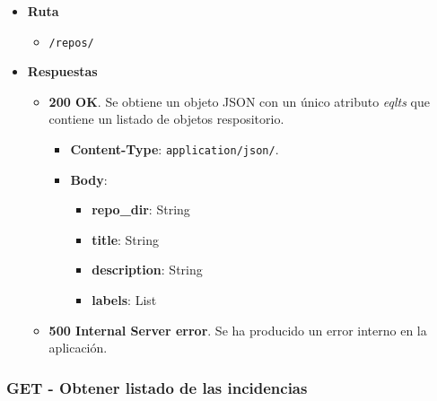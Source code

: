 \begin{itemize}
    \item[] \textbf{Ruta}
        \begin{itemize} \setlength\itemsep{0.2em}
            \item[] \texttt{/repos/}
        \end{itemize}
    \item[] \textbf{Respuestas}
        \begin{itemize} \setlength\itemsep{0.2em}
            \item[] \textbf{200 OK}. Se obtiene un objeto JSON con un único atributo \textit{eqlts} que contiene un listado de objetos respositorio.
                \begin{itemize} \setlength\itemsep{0.2em}
                    \item[] \textbf{Content-Type}: \texttt{application/json/}.
                    \item[] \textbf{Body}: 
                        \begin{itemize} \setlength\itemsep{0.2em}
                            \item[] \textbf{repo\_dir}: String
                            \item[] \textbf{title}: String
                            \item[] \textbf{description}: String
                            \item[] \textbf{labels}: List
                        \end{itemize}
                \end{itemize}
            \item[] \textbf{500 Internal Server error}. Se ha producido un error interno en la aplicación.
        \end{itemize}
\end{itemize}

\subsubsection{GET - Obtener listado de las incidencias}

